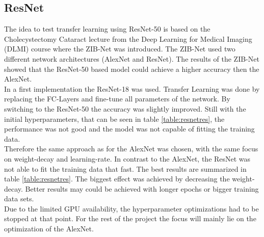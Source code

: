 \documentclass{article}
\begin{document}
\subsection{ResNet}
The idea to test transfer learning using ResNet-50 is based on the Cholecystectomy Cataract lecture from the Deep Learning for Medical Imaging (DLMI) course where the ZIB-Net was introduced. The ZIB-Net used two different network architectures (AlexNet and ResNet). The results of the ZIB-Net showed that the ResNet-50 based model could achieve a higher accuracy then the AlexNet.\\
In a first implementation the ResNet-18 was used. Transfer Learning was done by replacing the FC-Layers and fine-tune all parameters of the network. By switching to the ResNet-50 the accuracy was slightly improved. Still with the initial hyperparameters, that can be seen in table \ref{table:resnetres}, the performance was not good and the model was not capable of fitting the training data.\\
Therefore the same approach as for the AlexNet was chosen, with the same focus on weight-decay and learning-rate. In contrast to the AlexNet, the ResNet was not able to fit the training data that fast. The best results are summarized in table \ref{table:resnetres}. The biggest effect was achieved by decreasing the weight-decay. Better results may could be achieved with longer epochs or bigger training data sets.\\
Due to the limited GPU availability, the hyperparameter optimizations had to be stopped at that point. For the rest of the project the focus will mainly lie on the optimization of the AlexNet.
\end{document}
